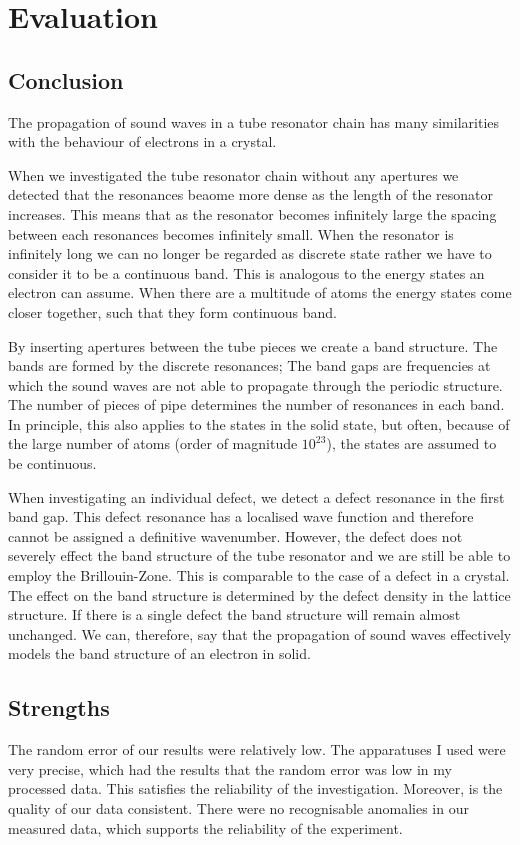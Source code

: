 \documentclass[12pt]{article}
\begin{document}
\section{Evaluation}
\subsection{Conclusion}
The propagation of sound waves in a tube resonator chain has many similarities with the behaviour of electrons in a crystal.

When we investigated the tube resonator chain without any apertures we detected that the resonances beaome more dense as the length of the resonator increases. This means that as the resonator becomes infinitely large the spacing between each resonances becomes infinitely small. When the resonator is infinitely long we can no longer be regarded as discrete state rather we have to consider it to be a continuous band. This is analogous to the energy states an electron can assume. When there are a multitude of atoms the energy states come closer together, such that they form continuous band.

By inserting apertures between the tube pieces we create a band structure. The bands are formed by the discrete resonances; The band gaps are frequencies at which the sound waves are not able to propagate through the periodic structure. The number of pieces of pipe determines the number of resonances in each band. In principle, this also applies to the states in the solid state, but often, because of the large number of atoms (order of magnitude $10^{23}$), the states are assumed to be continuous.

When investigating an individual defect, we detect a defect resonance in the first band gap. This defect resonance has a localised wave function and therefore cannot be assigned a definitive wavenumber. However, the defect does not severely effect the band structure of the tube resonator and we are still be able to employ the Brillouin-Zone. This is comparable to the case of a defect in a crystal. The effect on the band structure is determined by the defect density in the lattice structure. If there is a single defect the band structure will remain almost unchanged.
We can, therefore, say that the propagation of sound waves effectively models the band structure of an electron in solid. 
\subsection{Strengths}
The random error of our results were relatively low. The apparatuses I used were very precise, which had the results that the random error was low in my processed data. This satisfies the reliability of the investigation. Moreover, is the quality of our data consistent. There were no recognisable anomalies in our measured data, which supports the reliability of the experiment. 
\end{document}

